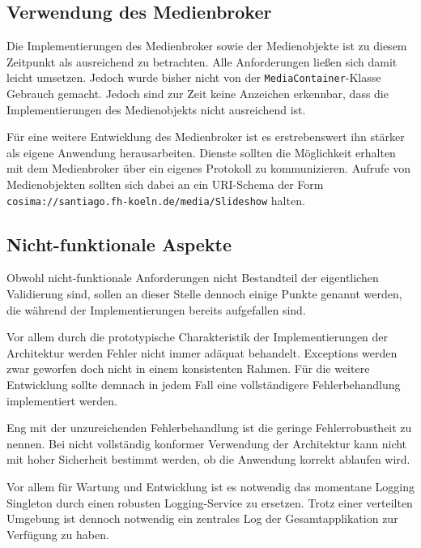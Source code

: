 
\subsection{Verwendung des Medienbroker} %
\label{sub:verwendung_des_medienbroker}

  Die Implementierungen des Medienbroker sowie der Medienobjekte ist zu diesem Zeitpunkt als ausreichend zu betrachten. Alle Anforderungen ließen sich damit leicht umsetzen. Jedoch wurde bisher nicht von der \verb!MediaContainer!-Klasse Gebrauch gemacht. Jedoch sind zur Zeit keine Anzeichen erkennbar, dass die Implementierungen des Medienobjekts nicht ausreichend ist.
  
  Für eine weitere Entwicklung des Medienbroker ist es erstrebenswert ihn stärker als eigene Anwendung herausarbeiten. Dienste sollten die Möglichkeit erhalten mit dem Medienbroker über ein eigenes Protokoll zu kommunizieren. Aufrufe von Medienobjekten sollten sich dabei an ein URI-Schema der Form \verb!cosima://santiago.fh-koeln.de/media/Slideshow! halten.


\subsection{Nicht-funktionale Aspekte} %
\label{sub:nicht_funktionale_aspekte}

  Obwohl nicht-funktionale Anforderungen nicht Bestandteil der eigentlichen Validierung sind, sollen an dieser Stelle dennoch einige Punkte genannt werden, die während der Implementierungen bereits aufgefallen sind.
  
  Vor allem durch die prototypische Charakteristik der Implementierungen der Architektur werden Fehler nicht immer adäquat behandelt. Exceptions werden zwar geworfen doch nicht in einem konsistenten Rahmen. Für die weitere Entwicklung sollte demnach in jedem Fall eine vollständigere Fehlerbehandlung implementiert werden.

  Eng mit der unzureichenden Fehlerbehandlung ist die geringe Fehlerrobustheit zu nennen. Bei nicht vollständig konformer Verwendung der Architektur kann nicht mit hoher Sicherheit bestimmt werden, ob die Anwendung korrekt ablaufen wird.

  Vor allem für Wartung und Entwicklung ist es notwendig das momentane Logging Singleton durch einen robusten Logging-Service zu ersetzen. Trotz einer verteilten Umgebung ist dennoch notwendig ein zentrales Log der Gesamtapplikation zur Verfügung zu haben.

